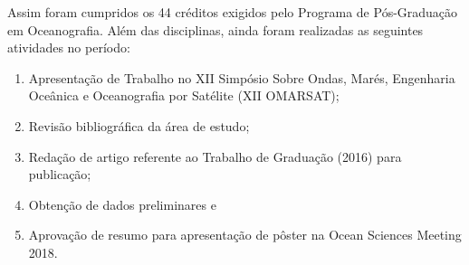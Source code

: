\bigskip

\hspace{5mm} Assim foram cumpridos os 44 créditos exigidos pelo Programa de Pós-Graduação em Oceanografia. Além das disciplinas, ainda foram realizadas as seguintes atividades no período:

\vspace{-\topsep}
\begin{enumerate}[noitemsep]
    \item Apresentação de Trabalho no XII Simpósio Sobre Ondas, Marés, Engenharia Oceânica e Oceanografia por Satélite (XII OMARSAT);
    \item Revisão bibliográfica da área de estudo;
    \item Redação de artigo referente ao Trabalho de Graduação (2016) para publicação;
        \item Obtenção de dados preliminares e
    \item Aprovação de resumo para apresentação de pôster na Ocean Sciences Meeting 2018.
\end{enumerate}
